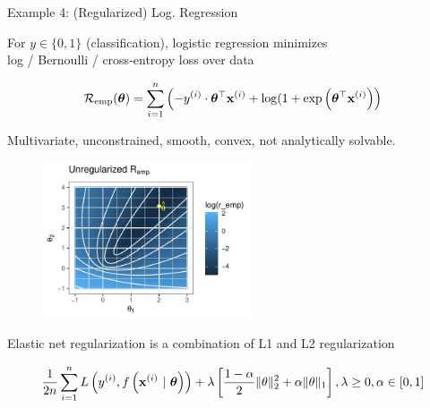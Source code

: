 \documentclass[11pt,compress,t,notes=noshow, xcolor=table]{beamer}
\begin{document}
\begin{vbframe}{Example 4: (Regularized) Log. Regression}

\vspace*{-0.5cm}

For $y \in \{0, 1\}$ (classification), logistic regression minimizes \\
log / Bernoulli / cross-entropy loss over data

\vspace*{-0.5cm}

\begin{eqnarray*}
	\mathcal{R}_{\text{emp}}(\bm{\theta}) = \sum\limits_{i=1}^n \left(-y^{(i)} \cdot \bm{\theta}^\top\mathbf{x}^{(i)} + \log(1 + \exp\left(\bm{\theta}^\top\mathbf{x}^{(i)}\right)\right) 
\end{eqnarray*}

Multivariate, unconstrained, smooth, convex, not analytically solvable. 

\vspace*{-0.3cm}

\begin{figure}
	\includegraphics[width=0.55\textwidth]{figure_man/logreg-0.pdf}
\end{figure}

\framebreak 

\vspace*{-0.9cm}

Elastic net regularization is a combination of L1 and L2 regularization %

\vspace*{-0.4cm}

\begin{footnotesize}
\begin{eqnarray*}
	\frac{1}{2n} \sum\limits_{i=1}^n L\left(y^{(i)}, f\left(\mathbf{x}^{(i)} ~|~ \bm{\theta}\right)\right) + \lambda \left[\frac{1-\alpha}{2}\|\theta\|^{2}_{2} + \alpha\|\theta\|_{1}\right], \lambda \geq 0, \alpha \in [0,1]
\end{eqnarray*}
\end{footnotesize}


\end{vbframe}
\end{document}
